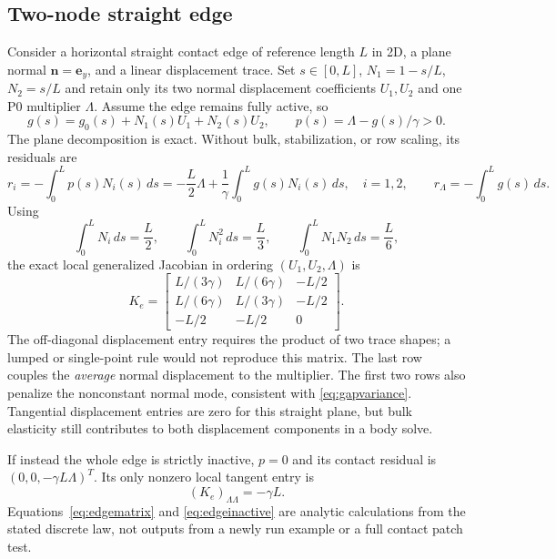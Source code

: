 \documentclass[preprint,11pt]{elsarticle}
\numberwithin{equation}{section}
\newcommand{\bn}{\boldsymbol{n}}
\begin{document}
\subsection{Two-node straight edge}
Consider a horizontal straight contact edge of reference length $L$ in
2D, a plane normal $\bn=\boldsymbol e_y$, and a linear displacement
trace. Set $s\in[0,L]$, $N_1=1-s/L$, $N_2=s/L$ and retain only its
two normal displacement coefficients $U_1,U_2$ and one P0 multiplier
$\Lambda$. Assume the edge remains fully active, so
\begin{equation}
 g(s)=g_0(s)+N_1(s)U_1+N_2(s)U_2,\qquad
 p(s)=\Lambda-g(s)/\gamma>0.
 \label{eq:edgegap}
\end{equation}
The plane decomposition is exact. Without bulk, stabilization, or row
scaling, its residuals are
\begin{equation}
 r_i=-\int_0^L p(s)N_i(s)\,ds
     =-\frac L2\Lambda+\frac1\gamma\int_0^L g(s)N_i(s)\,ds,
 \quad i=1,2,\qquad
 r_\Lambda=-\int_0^L g(s)\,ds.
 \label{eq:edgeresidual}
\end{equation}
Using
\begin{equation}
 \int_0^L N_i\,ds=\frac L2,\qquad
 \int_0^L N_i^2\,ds=\frac L3,\qquad
 \int_0^L N_1N_2\,ds=\frac L6,
 \label{eq:edgeintegrals}
\end{equation}
the exact local generalized Jacobian in ordering $(U_1,U_2,\Lambda)$ is
\begin{equation}
 \boxed{K_e=\begin{bmatrix}
 L/(3\gamma)&L/(6\gamma)&-L/2\\
 L/(6\gamma)&L/(3\gamma)&-L/2\\
 -L/2&-L/2&0
 \end{bmatrix}.}
 \label{eq:edgematrix}
\end{equation}
The off-diagonal displacement entry requires the product of two trace
shapes; a lumped or single-point rule would not reproduce this matrix.
The last row couples the \emph{average} normal displacement to the
multiplier. The first two rows also penalize the nonconstant normal mode,
consistent with \eqref{eq:gapvariance}. Tangential displacement entries
are zero for this straight plane, but bulk elasticity still contributes
to both displacement components in a body solve.

If instead the whole edge is strictly inactive, $p=0$ and its contact
residual is $(0,0,-\gamma L\Lambda)^T$. Its only nonzero local tangent
entry is
\begin{equation}
 (K_e)_{\Lambda\Lambda}=-\gamma L.
 \label{eq:edgeinactive}
\end{equation}
Equations~\eqref{eq:edgematrix} and \eqref{eq:edgeinactive} are analytic
calculations from the stated discrete law, not outputs from a newly run
example or a full contact patch test.
\end{document}
